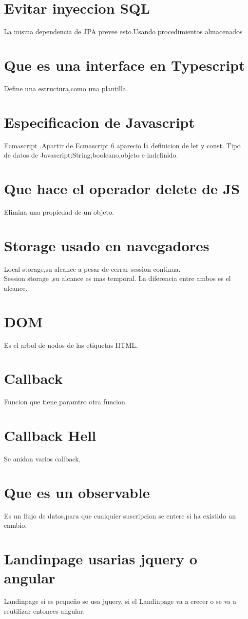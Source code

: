 \section{Evitar inyeccion SQL}
La misma dependencia de JPA prevee esto.Usando procedimientos almacenados
\section{Que es una interface en Typescript}
Define una estructura,como una plantilla.
\section{Especificacion de Javascript}
Ecmascript .Apartir de Ecmascript 6 aparecio la definicion de let y const.
Tipo de datos de Javascript:String,booleano,objeto e indefinido.
\section{Que hace el operador delete de JS}
Elimina una propiedad de un objeto.
\section{Storage usado en navegadores}
Local storage,su alcance a pesar de cerrar session continua.\\
Session storage ,su alcance es mas temporal.
La diferencia entre ambos es el alcance.
\section{DOM}
Es el arbol de nodos de las etiquetas HTML.
\section{Callback}
Funcion que tiene paramtro otra funcion.
\section{Callback Hell}
Se anidan varios callback.
\section{Que es un observable}
Es un flujo de datos,para que cualquier suscripcion se entere si ha existido un cambio.
\section{Landinpage usarias jquery o angular}
Landinpage si es pequeño se usa jquery, si el Landinpage va a crecer o se va a reutilizar entonces angular.
